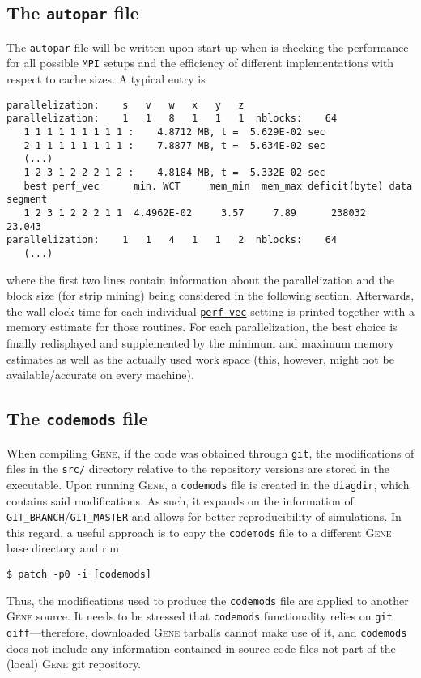 \documentclass[12pt]{article}
\begin{document}
\subsection{The \texttt{autopar} file}
\label{subsec:autopar-file}

The {\tt autopar} file will be written upon start-up when \gene is checking the performance for
all possible {\tt MPI} setups and the efficiency of different implementations with respect to cache sizes.
A typical entry is
{\scriptsize
\begin{verbatim}
parallelization:    s   v   w   x   y   z
parallelization:    1   1   8   1   1   1  nblocks:    64
   1 1 1 1 1 1 1 1 1 :    4.8712 MB, t =  5.629E-02 sec
   2 1 1 1 1 1 1 1 1 :    7.8877 MB, t =  5.634E-02 sec
   (...)
   1 2 3 1 2 2 2 1 2 :    4.8184 MB, t =  5.332E-02 sec
   best perf_vec      min. WCT     mem_min  mem_max deficit(byte) data segment
   1 2 3 1 2 2 2 1 1  4.4962E-02     3.57     7.89      238032    23.043
parallelization:    1   1   4   1   1   2  nblocks:    64
   (...)
\end{verbatim}}
where the first two lines contain information about the parallelization and the block size (for
strip mining) being considered in the following section. Afterwards, the wall clock time for each
individual \hyperlink{perf_vec}{\tt perf\_vec} setting is printed together with a memory estimate
for those routines. For each parallelization, the best choice is finally redisplayed and
supplemented by the minimum and maximum memory estimates as well as the actually used work space
(this, however, might not be available/accurate on every machine).

\subsection{The \texttt{codemods} file}
\label{subsec:codemods-file}

When compiling \textsc{Gene}, if the code was obtained through {\tt git}, the modifications of files in
the \texttt{src/} directory relative to the repository versions are stored in the executable.
Upon running \textsc{Gene}, a \texttt{codemods} file is created in the \texttt{diagdir}, which
contains said modifications. As such, it expands on the information of \texttt{GIT\_BRANCH}/{\tt GIT\_MASTER} and
allows for better reproducibility of simulations. In this regard, a useful approach is to copy
the \texttt{codemods} file to a different \textsc{Gene} base directory and run
\begin{verbatim}
$ patch -p0 -i [codemods]
\end{verbatim}
Thus, the modifications used to produce the \texttt{codemods} file are applied to another
\textsc{Gene} source. It needs to be stressed that \texttt{codemods} functionality relies on
\texttt{git diff}---therefore, downloaded \textsc{Gene} tarballs cannot make use of it, and
\texttt{codemods} does not include any information contained in source code files not part of
the (local) \textsc{Gene} git repository.
\end{document}
